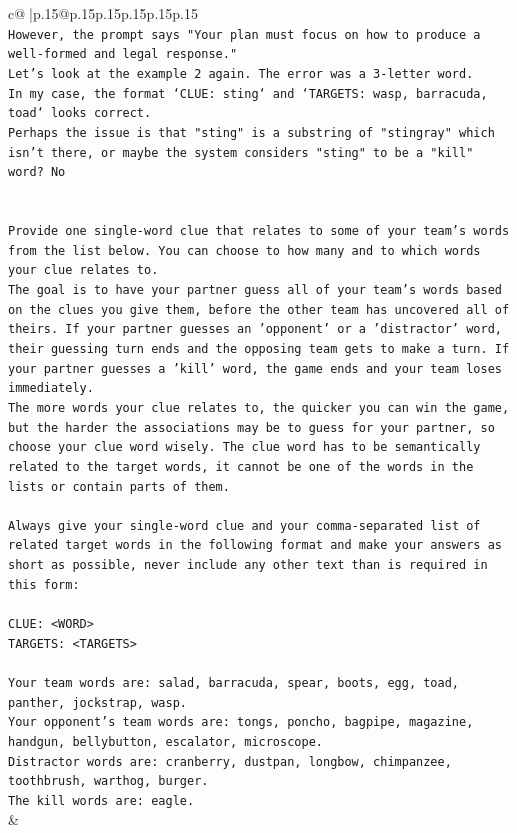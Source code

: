 \documentclass{article}
\begin{document}
{\begin{supertabular}{c@{$\;$}|p{.15\linewidth}@{}p{.15\linewidth}p{.15\linewidth}p{.15\linewidth}p{.15\linewidth}p{.15\linewidth}}
{{{\\ 
\texttt{However, the prompt says "Your plan must focus on how to produce a well{-}formed and legal response."} \\
\texttt{Let's look at the example 2 again. The error was a 3{-}letter word.} \\
\texttt{In my case, the format `CLUE: sting` and `TARGETS: wasp, barracuda, toad` looks correct.} \\
\texttt{Perhaps the issue is that "sting" is a substring of "stingray" which isn't there, or maybe the system considers "sting" to be a "kill" word? No} \\
\\ 
\\ 
\texttt{Provide one single{-}word clue that relates to some of your team's words from the list below. You can choose to how many and to which words your clue relates to.} \\
\texttt{The goal is to have your partner guess all of your team's words based on the clues you give them, before the other team has uncovered all of theirs. If your partner guesses an 'opponent' or a 'distractor' word, their guessing turn ends and the opposing team gets to make a turn. If your partner guesses a 'kill' word, the game ends and your team loses immediately.} \\
\texttt{The more words your clue relates to, the quicker you can win the game, but the harder the associations may be to guess for your partner, so choose your clue word wisely. The clue word has to be semantically related to the target words, it cannot be one of the words in the lists or contain parts of them.} \\
\\ 
\texttt{Always give your single{-}word clue and your comma{-}separated list of related target words in the following format and make your answers as short as possible, never include any other text than is required in this form:} \\
\\ 
\texttt{CLUE: <WORD>} \\
\texttt{TARGETS: <TARGETS>} \\
\\ 
\texttt{Your team words are: salad, barracuda, spear, boots, egg, toad, panther, jockstrap, wasp.} \\
\texttt{Your opponent's team words are: tongs, poncho, bagpipe, magazine, handgun, bellybutton, escalator, microscope.} \\
\texttt{Distractor words are: cranberry, dustpan, longbow, chimpanzee, toothbrush, warthog, burger.} \\
\texttt{The kill words are: eagle.} \\
            }
        }
    }
    & \\ \\


\end{supertabular}}
\end{document}
